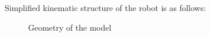 \documentclass[a4paper]{article}
\begin{document}
\newpage

\noindent Simplified kinematic structure of the robot is as follows:

\begin{figure}[h!]
  \centering
      
  \caption{Geometry of the model}
\end{figure}














\end{document}
